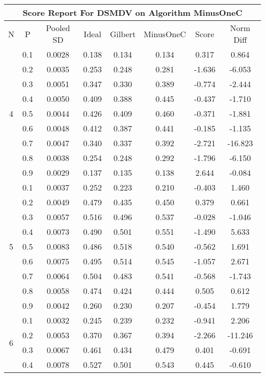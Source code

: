 \documentclass[11pt,a4paper]{report}
\begin{document}
\begin{longtable}{ | c | c || c | c | c | c | c | c | }
\hline
\multicolumn{8}{|c|}{ Score Report For DSMDV on Algorithm MinusOneC} \\
\hline
N & P & Pooled SD &  Ideal &  Gilbert & MinusOneC  & Score & Norm Diff \\
 \hline
 \hline
 \endhead
\multirow{9}{*}{4} & 0.1 & 0.0028 & 0.138 & 0.134 & 0.134 & 0.317 & 0.864 \\
 & 0.2 & 0.0035 & 0.253 & 0.248 & 0.281 & -1.636 & -6.053 \\
 & 0.3 & 0.0051 & 0.347 & 0.330 & 0.389 & -0.774 & -2.444 \\
 & 0.4 & 0.0050 & 0.409 & 0.388 & 0.445 & -0.437 & -1.710 \\
 & 0.5 & 0.0044 & 0.426 & 0.409 & 0.460 & -0.371 & -1.881 \\
 & 0.6 & 0.0048 & 0.412 & 0.387 & 0.441 & -0.185 & -1.135 \\
 & 0.7 & 0.0047 & 0.340 & 0.337 & 0.392 & -2.721 & -16.823 \\
 & 0.8 & 0.0038 & 0.254 & 0.248 & 0.292 & -1.796 & -6.150 \\
 & 0.9 & 0.0029 & 0.137 & 0.135 & 0.138 & 2.644 & -0.084 \\
 \hline
\multirow{9}{*}{5} & 0.1 & 0.0037 & 0.252 & 0.223 & 0.210 & -0.403 & 1.460 \\
 & 0.2 & 0.0049 & 0.479 & 0.435 & 0.450 & 0.379 & 0.661 \\
 & 0.3 & 0.0057 & 0.516 & 0.496 & 0.537 & -0.028 & -1.046 \\
 & 0.4 & 0.0073 & 0.490 & 0.501 & 0.551 & -1.490 & 5.633 \\
 & 0.5 & 0.0083 & 0.486 & 0.518 & 0.540 & -0.562 & 1.691 \\
 & 0.6 & 0.0075 & 0.495 & 0.514 & 0.545 & -1.057 & 2.671 \\
 & 0.7 & 0.0064 & 0.504 & 0.483 & 0.541 & -0.568 & -1.743 \\
 & 0.8 & 0.0058 & 0.474 & 0.424 & 0.444 & 0.505 & 0.612 \\
 & 0.9 & 0.0042 & 0.260 & 0.230 & 0.207 & -0.454 & 1.779 \\
 \hline
\multirow{9}{*}{6} & 0.1 & 0.0032 & 0.245 & 0.239 & 0.232 & -0.941 & 2.206 \\
 & 0.2 & 0.0053 & 0.370 & 0.367 & 0.394 & -2.266 & -11.246 \\
 & 0.3 & 0.0067 & 0.461 & 0.434 & 0.479 & 0.401 & -0.691 \\
 & 0.4 & 0.0078 & 0.527 & 0.501 & 0.543 & 0.445 & -0.610 \\

\end{longtable}
\end{document}
